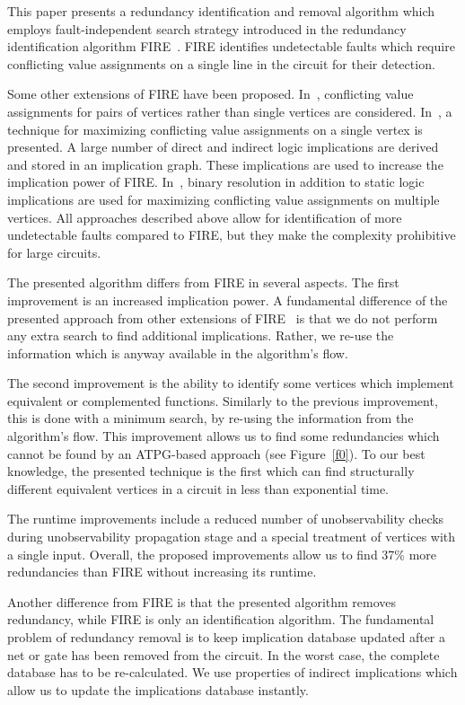 \documentclass[conference]{IEEEtran} \usepackage{times}
\begin{document}
This paper presents a redundancy identification and removal algorithm
which employs fault-independent search strategy introduced
in the redundancy identification algorithm FIRE~\cite{IyA96}. FIRE identifies undetectable faults which
require conflicting value assignments on a single line in the circuit
for their detection.  

Some other extensions of FIRE have been proposed.  In~\cite{GuH00},
conflicting value assignments for pairs of vertices rather than single
vertices are considered. In~\cite{Hs02}, a technique for maximizing
conflicting value assignments on a single vertex is presented. A
large number of direct and indirect logic implications are derived and
stored in an implication graph. These implications are used to
increase the implication power of FIRE.  In~\cite{ViSH05}, binary
resolution in addition to static logic implications are used for
maximizing conflicting value assignments on multiple vertices. All
approaches described above allow for identification of more
undetectable faults compared to FIRE, but they make the complexity 
prohibitive for large circuits.

The presented algorithm differs from FIRE in several aspects. The first 
improvement  is an increased
implication power.  A fundamental difference of the presented approach
from other extensions of FIRE~\cite{GuH00,Hs02,ViSH05} is that we do
not perform any extra search to find additional implications.  Rather,
we re-use the information which is anyway available in the algorithm's flow.

The second improvement is the ability to identify some vertices which
implement equivalent or complemented functions.  Similarly to the
previous improvement, this is done with a minimum search, by re-using
the information from the algorithm's flow.  This improvement allows us to find
some redundancies which cannot be found by an ATPG-based approach 
(see Figure~\ref{f0}). To our best knowledge, the presented technique
is the first which can find structurally different equivalent vertices
in a circuit in less than exponential time.

The runtime improvements include a reduced number of unobservability
checks during unobservability propagation stage and a special
treatment of vertices with a single input.  Overall, the proposed
improvements allow us to find 37\% more redundancies than FIRE without
increasing its runtime.

Another difference from FIRE is that the presented algorithm removes redundancy,
while FIRE is only an identification algorithm.  The fundamental
problem of redundancy removal is to keep implication database updated
after a net or gate has been removed from the circuit. In the worst
case, the complete database has to be re-calculated.  We
use properties of indirect implications which allow us to update the
implications database instantly.
\end{document}

